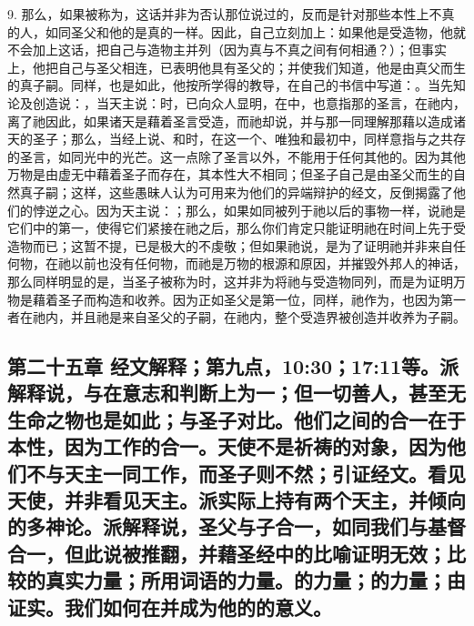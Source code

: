 9. 那么，如果被称为，这话并非为否认那位说过的，反而是针对那些本性上不真的人，如同圣父和他的是真的一样。因此，自己立刻加上：如果他是受造物，他就不会加上这话，把自己与造物主并列（因为真与不真之间有何相通？）；但事实上，他把自己与圣父相连，已表明他具有圣父的；并使我们知道，他是由真父而生的真子嗣。同样，也是如此，他按所学得的教导，在自己的书信中写道：。当先知论及创造说：，当天主说：时，已向众人显明，在中，也意指那的圣言，在祂内，离了祂因此，如果诸天是藉着圣言受造，而祂却说，并与那一同理解那藉以造成诸天的圣子；那么，当经上说、和时，在这一个、唯独和最初中，同样意指与之共存的圣言，如同光中的光芒。这一点除了圣言以外，不能用于任何其他的。因为其他万物是由虚无中藉着圣子而存在，其本性大不相同；但圣子自己是由圣父而生的自然真子嗣；这样，这些愚昧人认为可用来为他们的异端辩护的经文，反倒揭露了他们的悖逆之心。因为天主说：；那么，如果如同被列于祂以后的事物一样，说祂是它们中的第一，使得它们紧接在祂之后，那么你们肯定只能证明祂在时间上先于受造物而已；这暂不提，已是极大的不虔敬；但如果祂说，是为了证明祂并非来自任何物，在祂以前也没有任何物，而祂是万物的根源和原因，并摧毁外邦人的神话，那么同样明显的是，当圣子被称为时，这并非为将祂与受造物同列，而是为证明万物是藉着圣子而构造和收养。因为正如圣父是第一位，同样，祂作为，也因为第一者在祂内，并且祂是来自圣父的子嗣，在祂内，整个受造界被创造并收养为子嗣。\par


\subsection{第二十五章 经文解释；第九点，10:30；17:11等。派解释说，与在意志和判断上为一；但一切善人，甚至无生命之物也是如此；与圣子对比。他们之间的合一在于本性，因为工作的合一。天使不是祈祷的对象，因为他们不与天主一同工作，而圣子则不然；引证经文。看见天使，并非看见天主。派实际上持有两个天主，并倾向的多神论。派解释说，圣父与子合一，如同我们与基督合一，但此说被推翻，并藉圣经中的比喻证明无效；比较的真实力量；所用词语的力量。的力量；的力量；由证实。我们如何在并成为他的的意义。}

